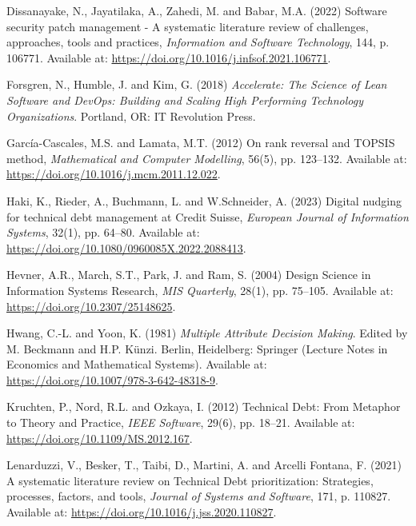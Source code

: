 \documentclass[
  11pt,
  letterpaper,
  11pt,
  oneside,
  english,
  onehalfspacing,
  headsepline]{MastersDoctoralThesis}
\newlength{\cslhangindent}
\newenvironment{CSLReferences}[2] %
 {\begin{list}{}{%
  \setlength{\itemindent}{0pt}
  \setlength{\leftmargin}{0pt}
  \setlength{\parsep}{0pt}
  \ifodd #1
   \setlength{\leftmargin}{\cslhangindent}
   \setlength{\itemindent}{-1\cslhangindent}
  \fi
  \setlength{\itemsep}{#2\baselineskip}}}
 {\end{list}}
\begin{document}
\begin{CSLReferences}{0}{1}
Dissanayake, N., Jayatilaka, A., Zahedi, M. and Babar, M.A. (2022)
\textquotesingle Software security patch management - {A} systematic
literature review of challenges, approaches, tools and
practices\textquotesingle, \emph{Information and Software Technology},
144, p. 106771. Available at:
\url{https://doi.org/10.1016/j.infsof.2021.106771}.

Forsgren, N., Humble, J. and Kim, G. (2018) \emph{Accelerate: {The
Science} of {Lean Software} and {DevOps}: {Building} and {Scaling High
Performing Technology Organizations}}. Portland, OR: IT Revolution
Press.

García-Cascales, M.S. and Lamata, M.T. (2012) \textquotesingle On rank
reversal and {TOPSIS} method\textquotesingle, \emph{Mathematical and
Computer Modelling}, 56(5), pp. 123--132. Available at:
\url{https://doi.org/10.1016/j.mcm.2011.12.022}.

Haki, K., Rieder, A., Buchmann, L. and W.Schneider, A. (2023)
\textquotesingle Digital nudging for technical debt management at
{Credit Suisse}\textquotesingle, \emph{European Journal of Information
Systems}, 32(1), pp. 64--80. Available at:
\url{https://doi.org/10.1080/0960085X.2022.2088413}.

Hevner, A.R., March, S.T., Park, J. and Ram, S. (2004)
\textquotesingle Design {Science} in {Information Systems
Research}\textquotesingle, \emph{MIS Quarterly}, 28(1), pp. 75--105.
Available at: \url{https://doi.org/10.2307/25148625}.

Hwang, C.-L. and Yoon, K. (1981) \emph{Multiple {Attribute Decision
Making}}. Edited by M. Beckmann and H.P. Künzi. Berlin, Heidelberg:
Springer (Lecture {Notes} in {Economics} and {Mathematical Systems}).
Available at: \url{https://doi.org/10.1007/978-3-642-48318-9}.

Kruchten, P., Nord, R.L. and Ozkaya, I. (2012)
\textquotesingle Technical {Debt}: {From Metaphor} to {Theory} and
{Practice}\textquotesingle, \emph{IEEE Software}, 29(6), pp. 18--21.
Available at: \url{https://doi.org/10.1109/MS.2012.167}.

Lenarduzzi, V., Besker, T., Taibi, D., Martini, A. and Arcelli Fontana,
F. (2021) \textquotesingle A systematic literature review on {Technical
Debt} prioritization: {Strategies}, processes, factors, and
tools\textquotesingle, \emph{Journal of Systems and Software}, 171, p.
110827. Available at: \url{https://doi.org/10.1016/j.jss.2020.110827}.


\end{CSLReferences}
\end{document}
